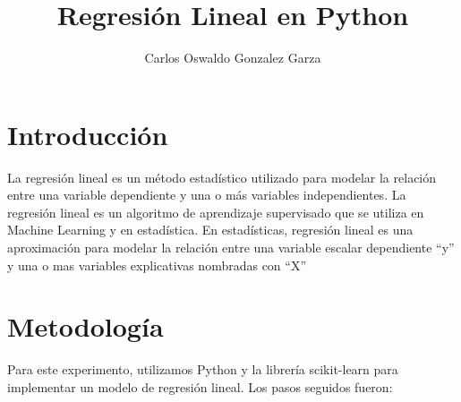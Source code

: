 \documentclass{article}
\title{Regresión Lineal en Python}
\author{Carlos Oswaldo Gonzalez Garza}
\begin{document}
\maketitle

\section{Introducción}
La regresión lineal es un método estadístico utilizado para modelar la relación entre una variable dependiente y una o más variables independientes. La regresión lineal es un algoritmo de aprendizaje supervisado que se utiliza en Machine
Learning y en estadística. En estadísticas, regresión lineal es una aproximación para modelar la relación entre una
variable escalar dependiente “y” y una o mas variables explicativas nombradas con “X”

\section{Metodología}
Para este experimento, utilizamos Python y la librería scikit-learn para implementar un modelo de regresión lineal. Los pasos seguidos fueron:
\end{document}

